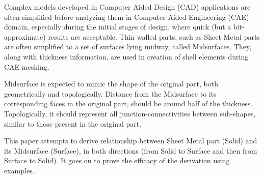 
Complex models developed in Computer Aided Design (CAD) applications are often simplified before analyzing them in Computer Aided Engineering (CAE) domain, especially during the initial stages of design, where quick (but a bit-approximate) results are acceptable. Thin walled parts, such as Sheet Metal parts are often simplified to a set of surfaces lying midway, called Midsurfaces. They, along with thickness information, are used in creation of shell elements during CAE meshing. 

Midsurface is expected to mimic the shape of the original part, both geometrically and topologically.  Distance from the Midsurface to its corresponding faces in the original part, should be around half of the thickness. Topologically, it should represent all junction-connectivities between sub-shapes, similar to those present in the original part.

This paper attempts to derive relationship between Sheet Metal part (Solid) and its Midsurface (Surface), in both directions (from Solid to Surface and then from Surface to Solid). It goes on to prove the efficacy of the derivation using examples.

